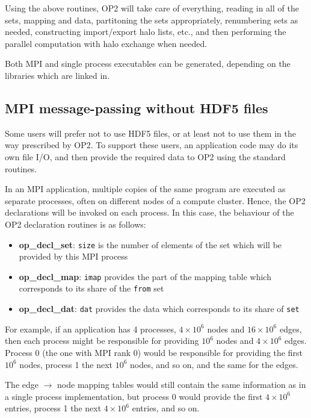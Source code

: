 \documentclass[11pt]{article}
\begin{document}
Using the above routines, OP2 will take care of everything, reading in all of
the sets, mapping and data, partitoning the sets appropriately, renumbering sets
as needed, constructing import/export halo lists, etc., and then performing the
parallel computation with halo exchange when needed.

Both MPI and single process executables can be generated, depending on the
libraries which are linked in.


\subsection{MPI message-passing without HDF5 files}

Some users will prefer not to use HDF5 files, or at least not to use them in
the way prescribed by OP2.  To support these users, an application code may
do its own file I/O, and then provide the required data to OP2 using the
standard routines.

In an MPI application, multiple copies of the same program are executed as
separate processes, often on different nodes of a compute cluster.  Hence,
the OP2 declarations will be invoked on each process.  In this case, the
behaviour of the OP2 declaration routines is as follows:
\begin{itemize}
\item {\bf op\_decl\_set}: {\tt size} is the number of elements of the set which
will be provided by this MPI process

\item {\bf op\_decl\_map}: {\tt imap} provides the part of the mapping table
which corresponds to its share of the {\tt from} set

\item {\bf op\_decl\_dat}: {\tt dat} provides the data which corresponds to its
share of {\tt set}
\end{itemize}

For example, if an application has 4 processes, $4\!\times\! 10^6$ nodes and
$16 \!\times\! 10^6$ edges, then each process might be responsible for providing
$10^6$ nodes and $4\!\times\! 10^6$ edges. Process 0 (the one with MPI rank 0)
would be responsible for providing the first $10^6$ nodes, process 1 the
next $10^6$ nodes, and so on, and the same for the edges.

The edge $\rightarrow$ node mapping tables would still contain the same
information as in a single process implementation, but process 0 would provide
the first $4\!\times\! 10^6$ entries, process 1 the next $4\!\times\! 10^6$ entries,
and so on.
\end{document}
